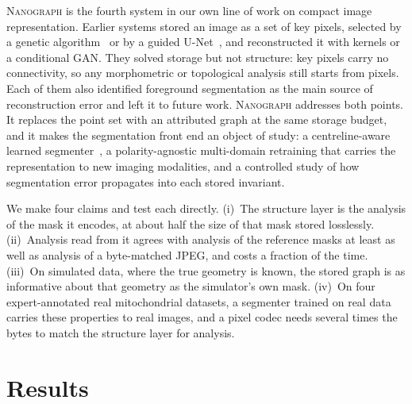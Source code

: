 \documentclass[10pt,a4paper]{article}
\newcommand{\method}{\textnormal{\textsc{Nanograph}}\xspace}
\begin{document}
\method is the fourth system in our own line of work on compact image
representation. Earlier systems stored an image as a set of key pixels,
selected by a genetic algorithm~\cite{malakar2025eaai} or by a guided
U-Net~\cite{banerjee2023acpr,banerjee2024gunetpp}, and reconstructed it with
kernels or a conditional GAN. They solved storage but not structure: key
pixels carry no connectivity, so any morphometric or topological analysis
still starts from pixels. Each of them also identified foreground
segmentation as the main source of reconstruction error and left it to
future work. \method addresses both points. It replaces the point set with
an attributed graph at the same storage budget, and it makes the
segmentation front end an object of study: a centreline-aware learned
segmenter~\cite{unet,cldice}, a polarity-agnostic multi-domain retraining
that carries the representation to new imaging modalities, and a controlled
study of how segmentation error propagates into each stored invariant.

We make four claims and test each directly. (i)~The structure layer is the
analysis of the mask it encodes, at about half the size of that mask stored
losslessly. (ii)~Analysis read from it agrees with analysis of the reference
masks at least as well as analysis of a byte-matched JPEG, and costs a
fraction of the time. (iii)~On simulated data, where the true geometry is
known, the stored graph is as informative about that geometry as the
simulator's own mask. (iv)~On four expert-annotated real mitochondrial
datasets, a segmenter trained on real data carries these properties to real
images, and a pixel codec needs several times the bytes to match the
structure layer for analysis.

\section{Results}
\end{document}
